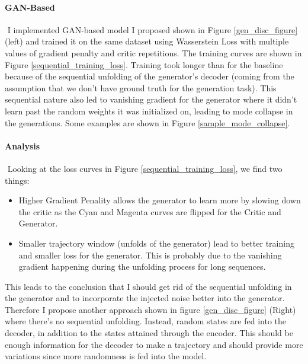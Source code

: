 \documentclass{article}
\begin{document}
\paragraph{GAN-Based}$ $
I implemented GAN-based model I proposed shown in Figure \ref{gen_disc_figure} (left) and trained it on the same dataset using Wasserstein Loss \cite{wloss} with multiple values of gradient penalty and critic repetitions. The training curves are shown in Figure \ref{sequential_training_loss}. Training took longer than for the baseline because of the sequential unfolding of the generator's decoder (coming from the assumption that we don't have ground truth for the generation task).  This sequential nature also led to vanishing gradient for the generator where it didn't learn past the random weights it was initialized on, leading to mode collapse in the generations. Some examples are shown in Figure \ref{sample_mode_collapse}.

\paragraph{Analysis}$ $
Looking at the loss curves in Figure \ref{sequential_training_loss}, we find two things:
\begin{itemize}
\item Higher Gradient Penality allows the generator to learn more by slowing down the critic as the Cyan and Magenta curves are flipped for the Critic and Generator.
\item Smaller trajectory window (unfolds of the generator) lead to better training and smaller loss for the generator.  This is probably due to the vanishing gradient happening during the unfolding process for long sequences.
\end{itemize}
This leads to the conclusion that I should get rid of the sequential unfolding in the generator and to incorporate the injected noise better into the generator. Therefore I propose another approach shown in figure \ref{gen_disc_figure} (Right) where there's no sequential unfolding. Instead, random states are fed into the decoder, in addition to the states attained through the encoder. This should be enough information for the decoder to make a trajectory and should provide more variations since more randomness is fed into the model.
\end{document}
